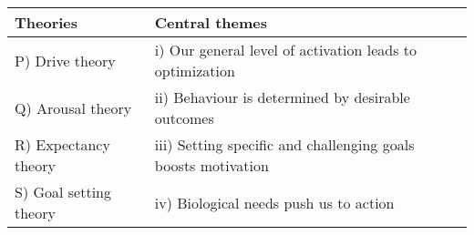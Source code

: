  \begin{tabular}{|l|p{7cm}|}
        \hline
        \textbf{Theories} & \textbf{Central themes} \\
        \hline
        P) Drive theory & i) Our general level of activation leads to optimization \\
        Q) Arousal theory & ii) Behaviour is determined by desirable outcomes \\
        R) Expectancy theory & iii) Setting specific and challenging goals boosts motivation \\
        S) Goal setting theory & iv) Biological needs push us to action \\
        \hline
    \end{tabular}

